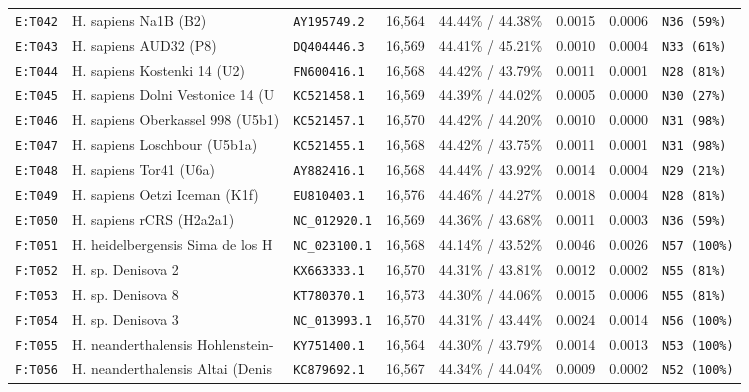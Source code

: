\documentclass[10pt,letterpaper]{article}
\begin{document}
\begin{longtable}{llllllll}
\texttt{E:T042} & H. sapiens Na1B (B2) & \texttt{AY195749.2} & 16,564 & 44.44\% / 44.38\% & 0.0015 & 0.0006 & \texttt{N36 (59\%)} \\
\texttt{E:T043} & H. sapiens AUD32 (P8) & \texttt{DQ404446.3} & 16,569 & 44.41\% / 45.21\% & 0.0010 & 0.0004 & \texttt{N33 (61\%)} \\
\texttt{E:T044} & H. sapiens Kostenki 14 (U2) & \texttt{FN600416.1} & 16,568 & 44.42\% / 43.79\% & 0.0011 & 0.0001 & \texttt{N28 (81\%)} \\
\texttt{E:T045} & H. sapiens Dolni Vestonice 14 (U & \texttt{KC521458.1} & 16,569 & 44.39\% / 44.02\% & 0.0005 & 0.0000 & \texttt{N30 (27\%)} \\
\texttt{E:T046} & H. sapiens Oberkassel 998 (U5b1) & \texttt{KC521457.1} & 16,570 & 44.42\% / 44.20\% & 0.0010 & 0.0000 & \texttt{N31 (98\%)} \\
\texttt{E:T047} & H. sapiens Loschbour (U5b1a) & \texttt{KC521455.1} & 16,568 & 44.42\% / 43.75\% & 0.0011 & 0.0001 & \texttt{N31 (98\%)} \\
\texttt{E:T048} & H. sapiens Tor41 (U6a) & \texttt{AY882416.1} & 16,568 & 44.44\% / 43.92\% & 0.0014 & 0.0004 & \texttt{N29 (21\%)} \\
\texttt{E:T049} & H. sapiens Oetzi Iceman (K1f) & \texttt{EU810403.1} & 16,576 & 44.46\% / 44.27\% & 0.0018 & 0.0004 & \texttt{N28 (81\%)} \\
\texttt{E:T050} & H. sapiens rCRS (H2a2a1) & \texttt{NC\_012920.1} & 16,569 & 44.36\% / 43.68\% & 0.0011 & 0.0003 & \texttt{N36 (59\%)} \\
\texttt{F:T051} & H. heidelbergensis Sima de los H & \texttt{NC\_023100.1} & 16,568 & 44.14\% / 43.52\% & 0.0046 & 0.0026 & \texttt{N57 (100\%)} \\
\texttt{F:T052} & H. sp. Denisova 2 & \texttt{KX663333.1} & 16,570 & 44.31\% / 43.81\% & 0.0012 & 0.0002 & \texttt{N55 (81\%)} \\
\texttt{F:T053} & H. sp. Denisova 8 & \texttt{KT780370.1} & 16,573 & 44.30\% / 44.06\% & 0.0015 & 0.0006 & \texttt{N55 (81\%)} \\
\texttt{F:T054} & H. sp. Denisova 3 & \texttt{NC\_013993.1} & 16,570 & 44.31\% / 43.44\% & 0.0024 & 0.0014 & \texttt{N56 (100\%)} \\
\texttt{F:T055} & H. neanderthalensis Hohlenstein- & \texttt{KY751400.1} & 16,564 & 44.30\% / 43.79\% & 0.0014 & 0.0013 & \texttt{N53 (100\%)} \\
\texttt{F:T056} & H. neanderthalensis Altai (Denis & \texttt{KC879692.1} & 16,567 & 44.34\% / 44.04\% & 0.0009 & 0.0002 & \texttt{N52 (100\%)} \\

\end{longtable}
\end{document}
